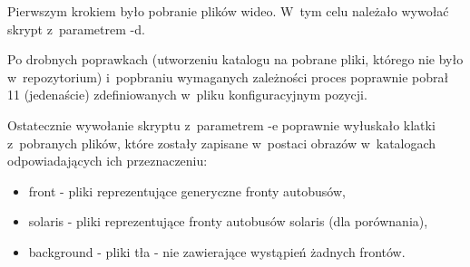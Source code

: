 Pierwszym krokiem było pobranie plików wideo. W~tym celu należało wywołać skrypt
z~parametrem -d.

Po drobnych poprawkach (utworzeniu katalogu na pobrane pliki, którego nie było
w~repozytorium) i~popbraniu wymaganych zależności proces poprawnie pobrał
11 (jedenaście) zdefiniowanych w~pliku konfiguracyjnym pozycji.

Ostatecznie wywołanie skryptu z~parametrem -e poprawnie wyłuskało klatki
z~pobranych plików, które zostały zapisane w~postaci obrazów w~katalogach
odpowiadających ich przeznaczeniu:

\begin{itemize}
\item front - pliki reprezentujące generyczne fronty autobusów,
\item solaris - pliki reprezentujące fronty autobusów solaris (dla porównania),
\item background - pliki tła - nie zawierające wystąpień żadnych frontów.
\end{itemize}


